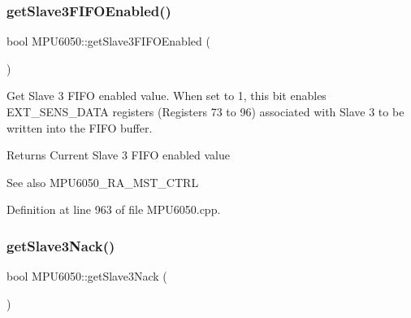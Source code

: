 \subsubsection{\texorpdfstring{getSlave3FIFOEnabled()}{getSlave3FIFOEnabled()}}
{\footnotesize\ttfamily bool M\+P\+U6050\+::get\+Slave3\+F\+I\+F\+O\+Enabled (\begin{DoxyParamCaption}{ }\end{DoxyParamCaption})}

Get Slave 3 F\+I\+FO enabled value. When set to 1, this bit enables E\+X\+T\+\_\+\+S\+E\+N\+S\+\_\+\+D\+A\+TA registers (Registers 73 to 96) associated with Slave 3 to be written into the F\+I\+FO buffer. \begin{DoxyReturn}{Returns}
Current Slave 3 F\+I\+FO enabled value 
\end{DoxyReturn}
\begin{DoxySeeAlso}{See also}
M\+P\+U6050\+\_\+\+R\+A\+\_\+\+M\+S\+T\+\_\+\+C\+T\+RL 
\end{DoxySeeAlso}


Definition at line 963 of file M\+P\+U6050.\+cpp.


\begin{DoxyCode}{0}

\end{DoxyCode}
\mbox{\label{classMPU6050_a55f24d2f2b13d6e28a7c8b6bf2913520}} 
\subsubsection{\texorpdfstring{getSlave3Nack()}{getSlave3Nack()}}
{\footnotesize\ttfamily bool M\+P\+U6050\+::get\+Slave3\+Nack (\begin{DoxyParamCaption}{ }\end{DoxyParamCaption})}


